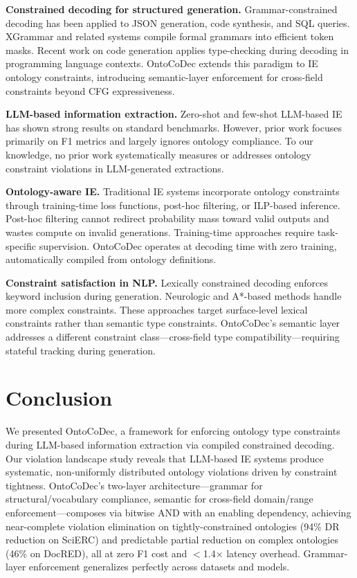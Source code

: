 \documentclass[11pt,a4paper]{article}
\newcommand{\sys}{OntoCoDec}
\begin{document}
\textbf{Constrained decoding for structured generation.}
Grammar-constrained decoding has been applied to JSON generation, code synthesis, and SQL queries.
XGrammar and related systems compile formal grammars into efficient token masks.
Recent work on code generation applies type-checking during decoding in programming language contexts.
\sys{} extends this paradigm to IE ontology constraints, introducing semantic-layer enforcement for cross-field constraints beyond CFG expressiveness.

\textbf{LLM-based information extraction.}
Zero-shot and few-shot LLM-based IE has shown strong results on standard benchmarks.
However, prior work focuses primarily on F1 metrics and largely ignores ontology compliance.
To our knowledge, no prior work systematically measures or addresses ontology constraint violations in LLM-generated extractions.

\textbf{Ontology-aware IE.}
Traditional IE systems incorporate ontology constraints through training-time loss functions, post-hoc filtering, or ILP-based inference.
Post-hoc filtering cannot redirect probability mass toward valid outputs and wastes compute on invalid generations.
Training-time approaches require task-specific supervision.
\sys{} operates at decoding time with zero training, automatically compiled from ontology definitions.

\textbf{Constraint satisfaction in NLP.}
Lexically constrained decoding enforces keyword inclusion during generation.
Neurologic and A*-based methods handle more complex constraints.
These approaches target surface-level lexical constraints rather than semantic type constraints.
\sys{}'s semantic layer addresses a different constraint class---cross-field type compatibility---requiring stateful tracking during generation.

\section{Conclusion}

We presented \sys{}, a framework for enforcing ontology type constraints during LLM-based information extraction via compiled constrained decoding.
Our violation landscape study reveals that LLM-based IE systems produce systematic, non-uniformly distributed ontology violations driven by constraint tightness.
\sys{}'s two-layer architecture---grammar for structural/vocabulary compliance, semantic for cross-field domain/range enforcement---composes via bitwise AND with an enabling dependency, achieving near-complete violation elimination on tightly-constrained ontologies (94\% DR reduction on SciERC) and predictable partial reduction on complex ontologies (46\% on DocRED), all at zero F1 cost and $<$1.4$\times$ latency overhead.
Grammar-layer enforcement generalizes perfectly across datasets and models.
\end{document}
